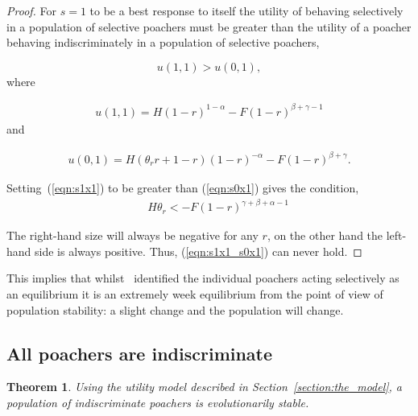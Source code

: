 \documentclass[10pt]{article}
\newtheorem{theorem}{Theorem}
\begin{document}
\begin{proof}
    For \(s=1\) to be a best response to itself the utility of behaving
    selectively in a population of selective poachers must be greater than the utility
    of a poacher behaving indiscriminately in a population of selective poachers,

    \begin{equation}
    u(1,1) > u(0,1),
    \end{equation}
    where
    
    \begin{eqnarray}
    \label{eqn:s1x1}
    u(1,1) = H(1 - r)^{1 - \alpha} - F(1 - r)^{\beta + \gamma - 1}
    \end{eqnarray}
    and 
    
    \begin{eqnarray}
    \label{eqn:s0x1}
    u(0,1) = H(\theta_r r +1 - r)(1 - r)^{-\alpha} - F(1 - r)^{\beta + \gamma}.
    \end{eqnarray}

    Setting~(\ref{eqn:s1x1}) to be greater than (\ref{eqn:s0x1}) gives the
    condition,
    \begin{eqnarray}
    \label{eqn:s1x1_s0x1}
    &&H \theta_r< -F(1 - r)^{\gamma + \beta + \alpha - 1}
    \end{eqnarray}

    The right-hand size  will always be negative
    for any \(r\), on the other hand the left-hand side is always positive.
    Thus, (\ref{eqn:s1x1_s0x1}) can never hold. 
\end{proof}

This implies that whilst~\cite{Lee} identified the individual poachers
acting selectively as an equilibrium it is an extremely week equilibrium from
the point of view of population stability: a slight change and the population
will change.

\subsection{All poachers are indiscriminate}

\begin{theorem}\label{theorem:indiscriminate}
Using the utility model described in Section~\ref{section:the_model}, a population
of indiscriminate poachers is evolutionarily stable.
\end{theorem}
\end{document}
